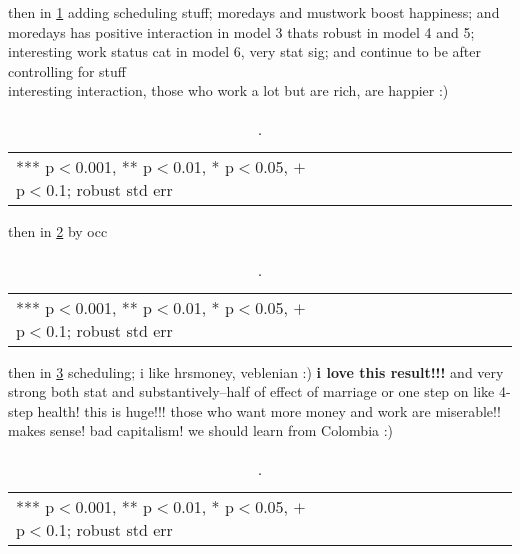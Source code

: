 \documentclass[10pt, letterpaper]{article}
\begin{document}
\begin{spacing}{1.4}
then in \ref{t2} adding scheduling stuff; moredays and  mustwork boost
happiness; and moredays has positive interaction in model 3 thats robust in
model 4 and 5; interesting work status cat in model 6, very stat sig; and
continue to be after controlling for stuff \\

interesting interaction, those who work a lot but are rich, are happier :)

\begin{spacing}{.9}
  \begin{table}[H]\centering \caption{.} \label{t2} \begin{scriptsize} \begin{tabular}{p{1.8in}p{.5in}p{.5in}p{.5in}p{.5in}p{.5in}p{.5in}p{.5in}p{.5in}p{.5in}p{.5
            in}p{.5in}p{.5 in}}\hline
        
\hline  *** p$<$0.001, ** p$<$0.01, * p$<$0.05, $+$ p$<$0.1; robust std err
         \end{tabular}\end{scriptsize}\end{table}
\end{spacing}

then in \ref{t3} by occ  

\begin{spacing}{.9}
  \begin{table}[H]\centering \caption{.} \label{t3} \begin{scriptsize} \begin{tabular}{p{1.8in}p{.5in}p{.5in}p{.5in}p{.5in}p{.5in}p{.5in}p{.5in}p{.5in}p{.5in}p{.5
            in}p{.5in}p{.5 in}}\hline
        
\hline  *** p$<$0.001, ** p$<$0.01, * p$<$0.05, $+$ p$<$0.1; robust std err
         \end{tabular}\end{scriptsize}\end{table}
\end{spacing}

then in \ref{t5} scheduling; i like hrsmoney, veblenian :)  \textbf{i love this
  result!!!} and very strong both stat and substantively--half of effect of
marriage or one step on like 4-step health! this is huge!!! those who want more
money and work are miserable!! makes sense! bad capitalism! we should learn from
Colombia :)


\begin{spacing}{.9}
  \begin{table}[H]\centering \caption{.} \label{t5} \begin{scriptsize} \begin{tabular}{p{1.8in}p{.5in}p{.5in}p{.5in}p{.5in}p{.5in}p{.5in}p{.5in}p{.5in}p{.5in}p{.5
            in}p{.5in}p{.5 in}}\hline
        
\hline  *** p$<$0.001, ** p$<$0.01, * p$<$0.05, $+$ p$<$0.1; robust std err
         \end{tabular}\end{scriptsize}\end{table}
\end{spacing}




\end{spacing}
\end{document}
